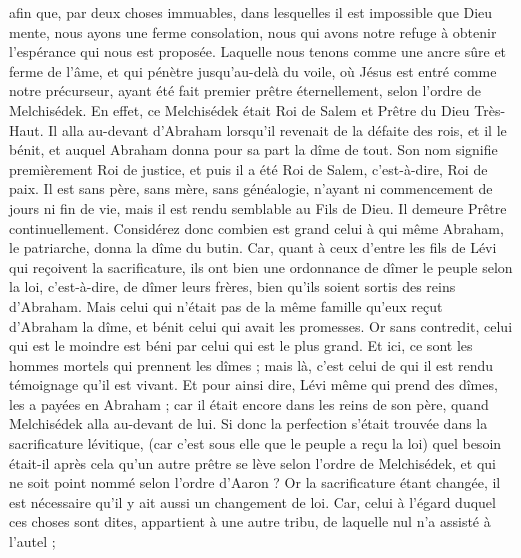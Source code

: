\begin{multicols}{2}
afin que, par deux choses immuables, dans lesquelles il est impossible que Dieu mente, nous ayons une ferme consolation, nous qui avons notre refuge à obtenir l'espérance qui nous est proposée.
Laquelle nous tenons comme une ancre sûre et ferme de l'âme, et qui pénètre jusqu'au-delà du voile,
où Jésus est entré comme notre précurseur, ayant été fait premier prêtre éternellement, selon l'ordre de Melchisédek.
\VerseOne{}En effet, ce Melchisédek était Roi de Salem et Prêtre du Dieu Très-Haut. Il alla au-devant d'Abraham lorsqu'il revenait de la défaite des rois, et il le bénit,
et auquel Abraham donna pour sa part la dîme de tout. Son nom signifie premièrement Roi de justice, et puis il a été Roi de Salem, c'est-à-dire, Roi de paix.
Il est sans père, sans mère, sans généalogie, n'ayant ni commencement de jours ni fin de vie, mais il est rendu semblable au Fils de Dieu. Il demeure Prêtre continuellement.
Considérez donc combien est grand celui à qui même Abraham, le patriarche, donna la dîme du butin.
Car, quant à ceux d'entre les fils de Lévi qui reçoivent la sacrificature, ils ont bien une ordonnance de dîmer le peuple selon la loi, c'est-à-dire, de dîmer leurs frères, bien qu'ils soient sortis des reins d'Abraham.
Mais celui qui n'était pas de la même famille qu'eux reçut d'Abraham la dîme, et bénit celui qui avait les promesses.
Or sans contredit, celui qui est le moindre est béni par celui qui est le plus grand.
Et ici, ce sont les hommes mortels qui prennent les dîmes ; mais là, c'est celui de qui il est rendu témoignage qu'il est vivant.
Et pour ainsi dire, Lévi même qui prend des dîmes, les a payées en Abraham ;
car il était encore dans les reins de son père, quand Melchisédek alla au-devant de lui.
Si donc la perfection s'était trouvée dans la sacrificature lévitique, (car c'est sous elle que le peuple a reçu la loi) quel besoin était-il après cela qu'un autre prêtre se lève selon l'ordre de Melchisédek, et qui ne soit point nommé selon l'ordre d'Aaron ?
Or la sacrificature étant changée, il est nécessaire qu'il y ait aussi un changement de loi.
Car, celui à l'égard duquel ces choses sont dites, appartient à une autre tribu, de laquelle nul n'a assisté à l'autel ;

\end{multicols}
